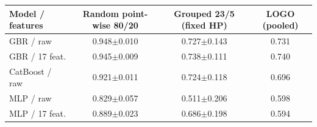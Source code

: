 \begin{tabular}{lccc}\toprule Model / features & Random point-wise 80/20 & Grouped 23/5 (fixed HP) & LOGO (pooled)\\\midrule
GBR / raw & 0.948$\pm$0.010 & 0.727$\pm$0.143 & 0.731\\
GBR / 17 feat. & 0.945$\pm$0.009 & 0.738$\pm$0.111 & 0.740\\
CatBoost / raw & 0.921$\pm$0.011 & 0.724$\pm$0.118 & 0.696\\
MLP / raw & 0.829$\pm$0.057 & 0.511$\pm$0.206 & 0.598\\
MLP / 17 feat. & 0.889$\pm$0.023 & 0.686$\pm$0.198 & 0.594\\
\bottomrule\end{tabular}